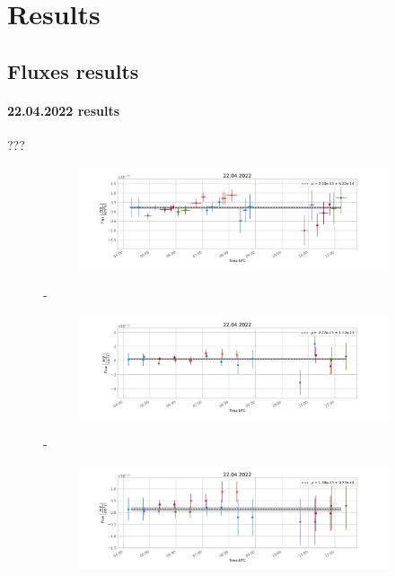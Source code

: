 \section{Results}
    \subsection{Fluxes results}

    \paragraph{22.04.2022 results}
    ???

        \begin{figure}[H]
        \centering
        \begin{subfigure}{\textwidth}
            \includegraphics[width=\textwidth]{report/Figures/results/lc_2204.png}
        \end{subfigure}%
        \hspace{1em}-
        \begin{subfigure}{\textwidth}
            \centering
            \includegraphics[width=\textwidth]{report/Figures/results/lc_2204_psf_notconst.png}
        \end{subfigure}
        \hspace{1em}-
        \begin{subfigure}{\textwidth}
            \centering
            \includegraphics[width=\textwidth]{report/Figures/results/lc_2204_psf_const.png}
        \end{subfigure}
        \caption{}
        \label{22_lc}
        \end{figure}
        

